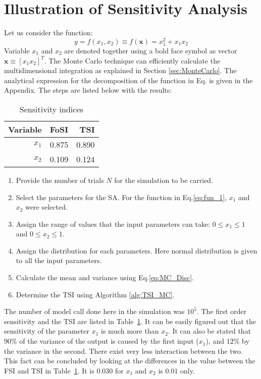 \section{Illustration of Sensitivity Analysis}
\label{app:example_SA}
Let us consider the function:
\begin{equation}
\label{eq:fun_1}
y=f(x_1,x_2) \equiv f(\mathbf{x}) =x_1^2+x_1x_2
\end{equation}
Variable $x_1$ and $x_2$ are denoted together using a bold face symbol as vector $\mathbf{x} \equiv [x_1 x_2]^T$. The Monte Carlo technique  can efficiently calculate the multidimensional integration as explained in Section \ref{sec:MonteCarlo}. The analytical expression for the decomposition of the function in Eq. is given in the Appendix. The steps are listed below with the results: 
\begin{table}[!b]
  \centering
  \caption{Sensitivity indices }
    \begin{tabular}{rrr}
    \hline
    Variable & FoSI  & TSI \\
    \hline
        $x_1$  & 0.875       & 0.890 \\
        $x_2$  &   0.109    &  0.124 \\
    \hline
    \end{tabular}%
  \label{tab:sen_func1}%
\end{table}%
\begin{enumerate}
\item Provide the number of trials $N$ for the simulation to be carried. 
\item Select the parameters for the SA. For the function in Eq.\eqref{eq:fun_1}, $x_1$ and $x_2$ were selected. 
\item Assign the range of values that the input parameters can take: $0 \leq x_1 \leq 1$ and $0\leq x_2 \leq 1$.
\item Assign the distribution for each parameters. Here normal distribution is given to all the input parameters.
\item Calculate the mean and variance using Eq.\eqref{eq:MC_Disc}. 
\item Determine the TSI using Algorithm \ref{alg:TSI_MC}. 
\end{enumerate}

\noindent The number of model call done here in the simulation was $10^5$. The first order sensitivity and the TSI are listed in Table~\ref{tab:sen_func1}. It can be easily figured out that the sensitivity of the parameter $x_1$ is much more than $x_2$. It can also be stated that $90 \%$ of the variance of the output is 
caused by the first input ($x_1$), and $12\%$ by the variance in the second. There exist very less interaction between the two. This fact can be concluded by looking at the differences in the value between the FSI and TSI in Table~\ref{tab:sen_func1}. It is $0.030$ for $x_1$ and $x_2$ is $0.01$ only.

